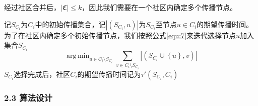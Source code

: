 \documentclass[UTF8]{ctexart}
\DeclareMathOperator*{\argmin}{arg\,min}
\begin{document}
\par 经过社区合并后，$\left | \mathfrak{C} \right | \leq k$，因此我们需要在一个社区内确定多个传播节点。
\par 记$S_{C_i}$为$C_i$中的初始传播集合，记$\left | (S_{C_i},u) \right |$为$S_{C_i}$至节点$u \in C_i$的期望传播时间。为了在社区内确定多个初始传播节点，我们按照公式\eqref{equ:7}来迭代选择节点$u$加入集合$S_{C_i}$
\begin{equation}
\argmin_{u \in C_i \setminus S_{C_i}}  \sum_{v \in C_i \setminus S_{C_i}} \left |(S_{C_i} \cup \left \{ u \right \},v) \right |
\label{equ:7}\end{equation}
$S_{C_i}$选择完成后，社区$C_i$的期望传播时间记为$\tau'(S_{C_i},C_{i})$

\subsubsection*{2.3 算法设计}
\end{document}

